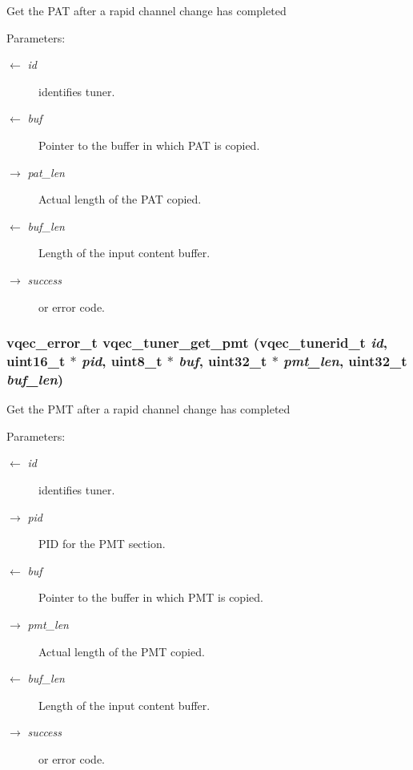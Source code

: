 Get the PAT after a rapid channel change has completed\begin{Desc}
\item[Parameters:]
\begin{description}
\item[\mbox{$\leftarrow$} {\em id}]identifies tuner. \item[\mbox{$\leftarrow$} {\em buf}]Pointer to the buffer in which PAT is copied. \item[\mbox{$\rightarrow$} {\em pat\_\-len}]Actual length of the PAT copied. \item[\mbox{$\leftarrow$} {\em buf\_\-len}]Length of the input content buffer. \item[\mbox{$\rightarrow$} {\em success}]or error code. \end{description}
\end{Desc}
\subsubsection{\setlength{\rightskip}{0pt plus 5cm}vqec\_\-error\_\-t vqec\_\-tuner\_\-get\_\-pmt (vqec\_\-tunerid\_\-t {\em id}, uint16\_\-t $\ast$ {\em pid}, uint8\_\-t $\ast$ {\em buf}, uint32\_\-t $\ast$ {\em pmt\_\-len}, uint32\_\-t {\em buf\_\-len})}\label{vqec__tuner_8c_de8175e809be82b1c14fa03b171e8ae9}


Get the PMT after a rapid channel change has completed\begin{Desc}
\item[Parameters:]
\begin{description}
\item[\mbox{$\leftarrow$} {\em id}]identifies tuner. \item[\mbox{$\rightarrow$} {\em pid}]PID for the PMT section. \item[\mbox{$\leftarrow$} {\em buf}]Pointer to the buffer in which PMT is copied. \item[\mbox{$\rightarrow$} {\em pmt\_\-len}]Actual length of the PMT copied. \item[\mbox{$\leftarrow$} {\em buf\_\-len}]Length of the input content buffer. \item[\mbox{$\rightarrow$} {\em success}]or error code. \end{description}
\end{Desc}
